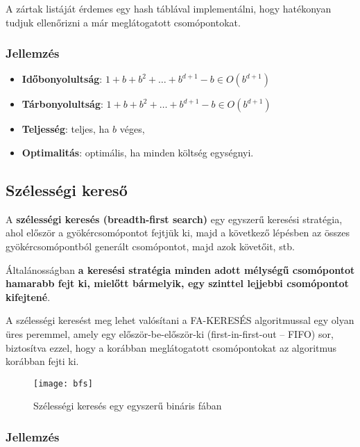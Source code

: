 \begin{megjegyzes}
    A zártak listáját érdemes egy hash táblával implementálni, hogy hatékonyan
    tudjuk ellenőrizni a már meglátogatott csomópontokat.
\end{megjegyzes}

\subsubsection{Jellemzés}

\begin{itemize}
    \item {\bf Időbonyolultság}: $1 + b + b^2 + \ldots + b^{d+1} - b \in O(b^{d+1})$
    \item {\bf Tárbonyolultság}: $1 + b + b^2 + \ldots + b^{d+1} - b \in O(b^{d+1})$
    \item {\bf Teljesség}: teljes, ha $b$ véges,
    \item {\bf Optimalitás}: optimális, ha minden költség egységnyi.
\end{itemize}

\subsection{Szélességi kereső}

A {\bf szélességi keresés (breadth-first search)} egy egyszerű keresési
stratégia, ahol először a gyökércsomópontot fejtjük ki, majd a következő
lépésben az összes gyökércsomópontból generált csomópontot, majd azok követőit,
stb.

Általánosságban {\bf a keresési stratégia minden adott mélységű csomópontot hamarabb
fejt ki, mielőtt bármelyik, egy szinttel lejjebbi csomópontot kifejtené}.

A szélességi keresést meg lehet valósítani a FA-KERESÉS algoritmussal egy olyan
üres peremmel, amely egy először-be-először-ki (first-in-first-out – FIFO) sor,
biztosítva ezzel, hogy a korábban meglátogatott csomópontokat az algoritmus
korábban fejti ki.

\begin{figure}[H]
    \centering
    \texttt{[image: bfs]}
    \caption{Szélességi keresés egy egyszerű bináris fában}
    \label{fig:bfs}
\end{figure}

\subsubsection{Jellemzés}

